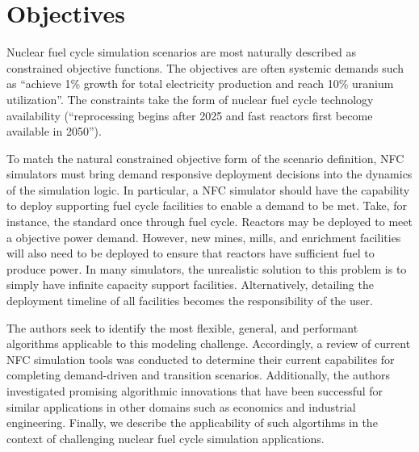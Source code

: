 \section{Objectives}
Nuclear fuel cycle simulation scenarios are most naturally described as 
constrained objective functions. The objectives are often systemic 
demands such as ``achieve 1\% growth for total electricity production 
and reach 10\% uranium utilization''. The constraints take 
the form of nuclear fuel cycle technology availability 
(``reprocessing begins after 2025 and fast reactors first become 
available in 2050'').

To match the natural constrained objective form of the scenario 
definition, \gls{NFC} simulators must bring demand responsive 
deployment decisions into the dynamics of the simulation logic.
In particular, a \gls{NFC} simulator should have the 
capability to deploy supporting fuel cycle facilities to enable 
a demand to be met. Take, for instance, the standard once through fuel 
cycle. Reactors may be deployed to meet a objective power demand. 
However, new mines, mills, and enrichment facilities will also need to be 
deployed to ensure that reactors have sufficient fuel to produce power.  
In many simulators, the unrealistic solution to this problem is to 
simply have infinite capacity support facilities. Alternatively, 
detailing the deployment timeline of all facilities becomes the 
responsibility of the user.

The authors seek to identify the most flexible, general, and performant 
algorithms applicable to this modeling challenge.  Accordingly, a review 
of current \gls{NFC} simulation tools was conducted to determine their current 
capabilites for completing demand-driven and transition scenarios. 
Additionally, the authors investigated promising algorithmic
innovations that have been successful for similar applications in other domains
such as economics and industrial engineering.
Finally, we describe the applicability of such algortihms in the context of 
challenging nuclear fuel cycle simulation applications.
